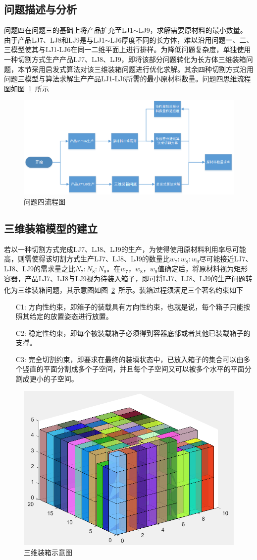 \documentclass{whutmod}
\newcommand{\upcite}[1]{\textsuperscript{\cite{#1}}}
\begin{document}
  	\subsection{问题描述与分析}
  		问题四在问题三的基础上将产品扩充至LJ1$\sim$LJ9，求解需要原材料的最小数量。由于产品LJ7、LJ8和LJ9是与LJ1$\sim$LJ6厚度不同的长方体，难以沿用问题一、二、三模型使其与LJ1-LJ6在同一二维平面上进行排样。为降低问题复杂度，单独使用一种切割方式生产产品LJ7、LJ8、LJ9，即将该部分问题转化为长方体三维装箱问题，本节采用启发式算法对该三维装箱问题进行优化求解。其余四种切割方式沿用问题三模型与算法求解生产产品LJ1-LJ6所需的最小原材料数量。问题四思维流程图如图~\ref{dfasfd}~所示
  	\begin{figure}[H]
  		\centering
  		\includegraphics[width=.7\textwidth]{figures/4liu.png}
  		\caption{问题四流程图}\label{dfasfd}
  	\end{figure}
  	
  	\subsection{三维装箱模型的建立}
  	若以一种切割方式完成LJ7、LJ8、LJ9的生产，为使得使用原材料利用率尽可能高，则需使得该切割方式生产LJ7、LJ8、LJ9的数量比$w_7:w_8:w_9$尽可能接近LJ7、LJ8、LJ9的需求量之比$N_7:N_8:N_9$。在$w_7$，$w_8$，$w_9$值确定后，将原材料视为矩形容器，产品LJ7、LJ8与LJ9视为待装入箱子，即可将LJ7、LJ8、LJ9的生产问题转化为三维装箱问题，其示意图如图~\ref{sdaasd}~所示。装箱过程须满足三个著名约束\upcite{8}如下
  	\begin{itemize}
  			\item[C1:]方向性约束，即箱子的装载具有方向性约束，也就是说，每个箱子只能按照其给定的放置姿态进行放置。
  			\item[C2:]稳定性约束，即每个被装载箱子必须得到容器底部或者其他已装载箱子的支撑。
  		\item[C3:]完全切割约束，即要求在最终的装填状态中，已放入箱子的集合可以由多个竖直的平面分割成多个子空间，并且每个子空间又可以被多个水平的平面分割成更小的子空间。
  	\end{itemize}
    \begin{figure}[H]
  	\centering
  	\includegraphics[width=.6\textwidth]{figures/ac.png}
  	\caption{三维装箱示意图}\label{sdaasd}
  \end{figure}
\end{document}
